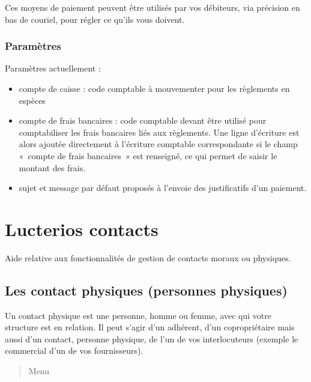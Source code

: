 \documentclass[a4paper,10pt,oneside,french]{sphinxmanual}
\begin{document}
\sphinxAtStartPar
Ces moyens de paiement peuvent être utilisés par vos débiteurs, via précision en bas de couriel, pour régler ce qu’ils vous doivent.


\subsection{Paramètres}
\label{\detokenize{payoff/config:parametres}}
 Paramètres actuellement :
\begin{itemize}
\item {} 
\sphinxAtStartPar
compte de caisse : code comptable à mouvementer pour les règlements en espèces

\item {} 
\sphinxAtStartPar
compte de frais bancaires : code comptable devant être utilisé pour comptabiliser les frais bancaires liés aux règlements. Une ligne d’écriture est alors ajoutée directement à l’écriture comptable correspondante si le champ « compte de frais bancaires » est renseigné, ce qui permet de saisir le montant des frais.

\item {} 
\sphinxAtStartPar
sujet et message par défaut proposés à l’envoie des justificatifs d’un paiement.

\end{itemize}

\sphinxstepscope


\chapter{Lucterios contacts}
\label{\detokenize{contacts/index:lucterios-contacts}}\label{\detokenize{contacts/index::doc}}
\sphinxAtStartPar
Aide relative aux fonctionnalités de gestion de contacts moraux ou physiques.

\sphinxstepscope


\section{Les contact physiques (personnes physiques)}
\label{\detokenize{contacts/individual:les-contact-physiques-personnes-physiques}}\label{\detokenize{contacts/individual::doc}}
\sphinxAtStartPar
Un contact physique est une personne, homme ou femme, avec qui votre structure est en relation. Il peut s’agir d’un adhérent, d’un copropriétaire mais aussi d’un contact, personne physique, de l’un de vos interlocuteurs (exemple le commercial d’un de vos fournisseurs).
\begin{quote}

\sphinxAtStartPar
Menu 
\end{quote}
\end{document}
